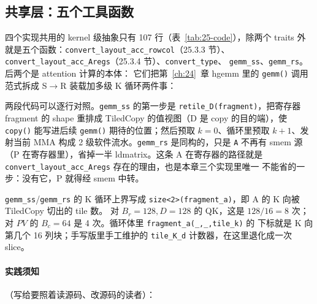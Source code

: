 \subsection{共享层：五个工具函数}

四个实现共用的 kernel 级抽象只有 107 行（表~\ref{tab:25-code}），除两个
traits 外就是五个函数：\texttt{convert\_\allowbreak{}layout\_\allowbreak{}acc\_\allowbreak{}rowcol}（25.3.3 节）、
\texttt{convert\_\allowbreak{}layout\_\allowbreak{}acc\_\allowbreak{}Aregs}（25.3.4 节）、\texttt{convert\_\allowbreak{}type}、
\texttt{gemm\_ss}、\texttt{gemm\_rs}。后两个是 attention 计算的本体：
它们把第~\ref{ch:24}~章 hgemm 里的 \texttt{gemm()} 调用范式拆成
S$\to$R 装载加多级 K 循环两件事：





两段代码可以逐行对照。\texttt{gemm\_ss} 的第一步是
\texttt{retile\_\allowbreak{}D\allowbreak{}(fragment)}，把寄存器 fragment 的 shape 重排成 TiledCopy
的值视图（D 是 copy 的目的端），使 \texttt{copy()} 能写进后续
\texttt{gemm()} 期待的位置；然后预取 $k{=}0$、循环里预取 $k{+}1$、发射当前 MMA
构成 2 级软件流水。\texttt{gemm\_rs} 是同构的，只是 \texttt{A} 不再有 smem 源
（P 在寄存器里），省掉一半 ldmatrix。这条 A 在寄存器的路径就是
\texttt{convert\_\allowbreak{}layout\_\allowbreak{}acc\_\allowbreak{}Aregs} 存在的理由，也是本章三个实现里唯一
不能省的一步：没有它，P 就得经 smem 中转。

\begin{remark}
  \texttt{gemm\_ss}/\texttt{gemm\_rs} 的 K 循环上界写成
  \texttt{size\allowbreak{}<2>\allowbreak{}(fragment\_\allowbreak{}a)}，即 A 的 K 向被 TiledCopy 切出的 tile 数。
  对 $B_r{=}128,D{=}128$ 的 QK，这是 $128/16 = 8$ 次；对 $PV$ 的
  $B_c{=}64$ 是 4 次。循环体里 \texttt{fragment\_\allowbreak{}a\allowbreak{}(\_\allowbreak{},\allowbreak{}\_\allowbreak{},\allowbreak{}tile\_\allowbreak{}k)} 的
  下标就是 K 向第几个 16 列块；手写版里手工维护的 \texttt{tile\_K\_d}
  计数器，在这里退化成一次 slice。
\end{remark}

\paragraph{实践须知}（写给要照着读源码、改源码的读者）：

